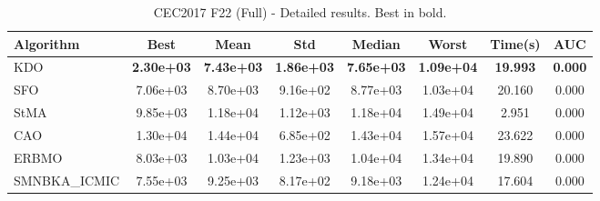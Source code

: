 \begin{table}[H]
\centering\small
\caption{CEC2017 F22 (Full) - Detailed results. Best in bold.}
\label{tab:cec2017_F22}
\begin{tabular}{lccccccc}
\toprule
\textbf{Algorithm} & \textbf{Best} & \textbf{Mean} & \textbf{Std} & \textbf{Median} & \textbf{Worst} & \textbf{Time(s)} & \textbf{AUC} \\
\midrule
KDO & \textbf{2.30e+03} & \textbf{7.43e+03} & \textbf{1.86e+03} & \textbf{7.65e+03} & \textbf{1.09e+04} & \textbf{19.993} & \textbf{0.000} \\
SFO & 7.06e+03 & 8.70e+03 & 9.16e+02 & 8.77e+03 & 1.03e+04 & 20.160 & 0.000 \\
StMA & 9.85e+03 & 1.18e+04 & 1.12e+03 & 1.18e+04 & 1.49e+04 & 2.951 & 0.000 \\
CAO & 1.30e+04 & 1.44e+04 & 6.85e+02 & 1.43e+04 & 1.57e+04 & 23.622 & 0.000 \\
ERBMO & 8.03e+03 & 1.03e+04 & 1.23e+03 & 1.04e+04 & 1.34e+04 & 19.890 & 0.000 \\
SMNBKA_ICMIC & 7.55e+03 & 9.25e+03 & 8.17e+02 & 9.18e+03 & 1.24e+04 & 17.604 & 0.000 \\
\bottomrule
\end{tabular}
\end{table}

